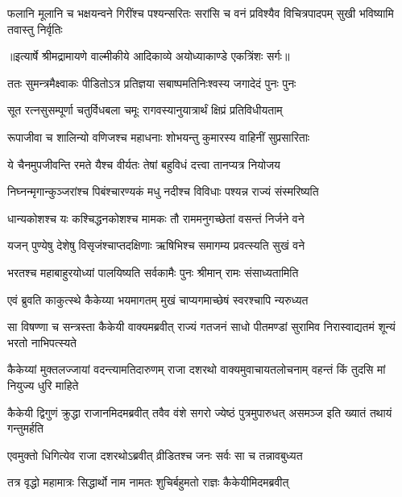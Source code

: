 \fourlineindentedshloka
{फलानि मूलानि च भक्षयन्वने}
{गिरींश्च पश्यन्सरितः सरांसि च}
{वनं प्रविश्यैव विचित्रपादपम्}
{सुखी भविष्यामि तवास्तु निर्वृतिः} %


{॥इत्यार्षे श्रीमद्रामायणे वाल्मीकीये आदिकाव्ये अयोध्याकाण्डे एकत्रिंशः सर्गः॥}


\twolineshloka
{ततः सुमन्त्रमैक्ष्वाकः पीडितोऽत्र प्रतिज्ञया}
{सबाष्पमतिनिःश्वस्य जगादेदं पुनः पुनः} %

\twolineshloka
{सूत रत्नसुसम्पूर्णा चतुर्विधबला चमूः}
{रागवस्यानुयात्रार्थं क्षिप्रं प्रतिविधीयताम्} %

\twolineshloka
{रूपाजीवा च शालिन्यो वणिजश्च महाधनाः}
{शोभयन्तु कुमारस्य वाहिनीं सुप्रसारिताः} %

\twolineshloka
{ये चैनमुपजीवन्ति रमते यैश्च वीर्यतः}
{तेषां बहुविधं दत्त्वा तानप्यत्र नियोजय} %

\twolineshloka
{निघ्नन्मृगान्कुञ्जरांश्च पिबंश्चारण्यकं मधु}
{नदीश्च विविधाः पश्यन्न राज्यं संस्मरिष्यति} %

\twolineshloka
{धान्यकोशश्च यः कश्चिद्धनकोशश्च मामकः}
{तौ राममनुगच्छेतां वसन्तं निर्जने वने} %

\twolineshloka
{यजन् पुण्येषु देशेषु विसृजंश्चाप्तदक्षिणाः}
{ऋषिभिश्च समागम्य प्रवत्स्यति सुखं वने} %

\twolineshloka
{भरतश्च महाबाहुरयोध्यां पालयिष्यति}
{सर्वकामैः पुनः श्रीमान् रामः संसाध्यतामिति} %

\twolineshloka
{एवं ब्रुवति काकुत्स्थे कैकेय्या भयमागतम्}
{मुखं चाप्यगमाच्छेषं स्वरश्चापि न्यरुध्यत} %

\threelineshloka
{सा विषण्णा च सन्त्रस्ता कैकेयी वाक्यमब्रवीत्}
{राज्यं गतजनं साधो पीतमण्डां सुरामिव}
{निरास्वाद्यतमं शून्यं भरतो नाभिपत्स्यते} %

\threelineshloka
{कैकेय्यां मुक्तलज्जायां वदन्त्यामतिदारुणम्}
{राजा दशरथो वाक्यमुवाचायतलोचनाम्}
{वहन्तं किं तुदसि मां नियुज्य धुरि माहिते} %

\threelineshloka
{कैकेयी द्विगुणं क्रुद्धा राजानमिदमब्रवीत्}
{तवैव वंशे सगरो ज्येष्ठं पुत्रमुपारुधत्}
{असमञ्ज इति ख्यातं तथायं गन्तुमर्हति} %

\twolineshloka
{एवमुक्तो धिगित्येव राजा दशरथोऽब्रवीत्}
{व्रीडितश्च जनः सर्वः सा च तन्नावबुध्यत} %

\twolineshloka
{तत्र वृद्धो महामात्रः सिद्धार्थो नाम नामतः}
{शुचिर्बहुमतो राज्ञः कैकेयीमिदमब्रवीत्} %

